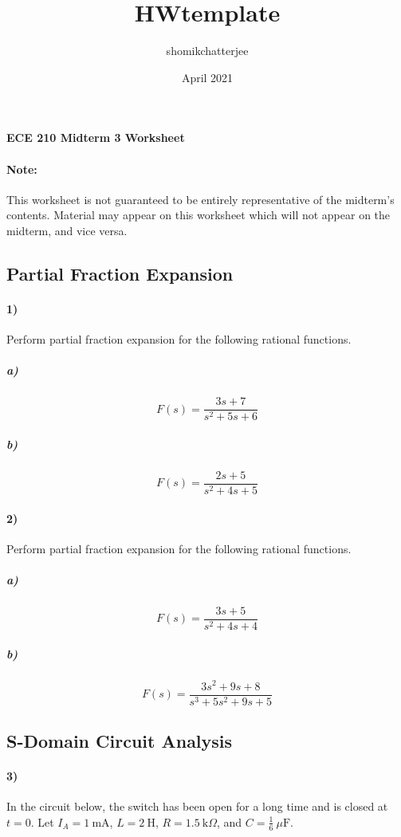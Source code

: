 \documentclass{article}
\title{HWtemplate}
\author{shomikchatterjee }
\date{April 2021}
\begin{document}
\begin{center}
\textbf{
{\Large ECE 210 Midterm 3 Worksheet}
}
\end{center} 
\noindent\makebox[\linewidth]{\rule{\linewidth}{0.4pt}}

\paragraph{Note:} This worksheet is not guaranteed to be entirely representative of the midterm's contents. Material may appear on this worksheet which will not appear on the midterm, and vice versa.

\subsection*{Partial Fraction Expansion}

\paragraph{1)} Perform partial fraction expansion for the following rational functions.

\subparagraph{a)}
\[
F(s) = \frac{3s+7}{s^2+5s+6}
\]

\subparagraph{b)}
\[
F(s)=\frac{2s+5}{s^2+4s+5}
\]




\paragraph{2)} Perform partial fraction expansion for the following rational functions.

\subparagraph{a)}
\[
F(s)=\frac{3s+5}{s^2+4s+4}
\]



\subparagraph{b)}
\[
F(s)=\frac{3s^2+9s+8}{s^3+5s^2+9s+5}
\]
\vfill

\newpage
\subsection*{S-Domain Circuit Analysis}

\paragraph{3)} In the circuit below, the switch has been open for a long time and is closed at $t=0$.
Let $I_A = 1~\text{mA}$, $L = 2~\text{H}$, $R = 1.5~\text{k}\Omega$, and $C = \frac{1}{6}~\mu\text{F}$.
\end{document}
